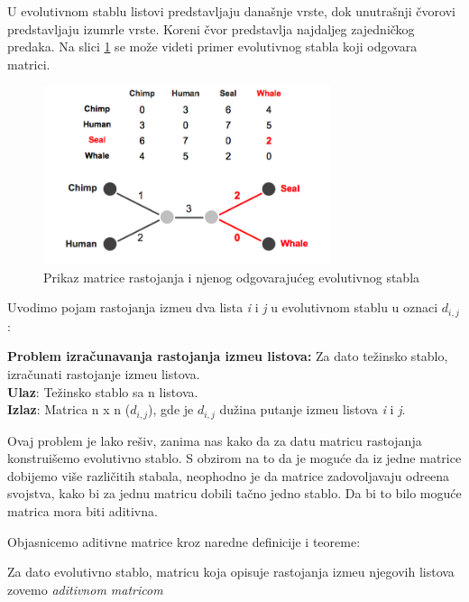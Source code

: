 U evolutivnom stablu listovi predstavljaju dana\v{s}nje vrste, dok unutra\v{s}nji \v{c}vorovi predstavljaju izumrle vrste. Koreni \v{c}vor predstavlja najdaljeg zajedni\v{c}kog predaka. Na slici \ref{fig:pmrioes} se mo\v{z}e videti primer evolutivnog stabla koji odgovara matrici.

\begin{figure}[h!]
\begin{center}
\includegraphics[width=0.75\textwidth]{poglavlja/7/slike/slika3.png}
\end{center}
\caption{Prikaz matrice rastojanja i njenog odgovaraju\'ceg evolutivnog stabla}
\label{fig:pmrioes}
\end{figure}

Uvodimo pojam rastojanja izme\dj u dva lista \textit{i} i \textit{j} u evolutivnom stablu u oznaci $d_{i, j}$:
\begin{tcolorbox}
\textbf{Problem izra\v{c}unavanja rastojanja izme\dj u listova:} Za dato te\v{z}insko stablo, izra\v{c}unati rastojanje izme\dj u listova.\\
\textbf{Ulaz}: Te\v{z}insko stablo sa n listova.\\
\textbf{Izlaz}: Matrica n x n ($d_{i, j}$), gde je $d_{i, j}$ du\v{z}ina putanje izme\dj u listova \textit{i} i \textit{j}.
\end{tcolorbox}

Ovaj problem je lako re\v{s}iv, zanima nas kako da za datu matricu rastojanja konstrui\v{s}emo evolutivno stablo. S obzirom na to da je mogu\'ce da iz jedne matrice dobijemo vi\v{s}e razli\v{c}itih stabala, neophodno je da matrice zadovoljavaju odre\dj ena svojstva, kako bi za jednu matricu dobili ta\v{c}no jedno stablo. Da bi to bilo mogu\'ce matrica mora biti aditivna.

Objasnicemo aditivne matrice kroz naredne definicije i teoreme:

\begin{definicija}
Za dato evolutivno stablo, matricu koja opisuje rastojanja izme\dj u njegovih listova zovemo \textit{aditivnom matricom}
\end{definicija}


